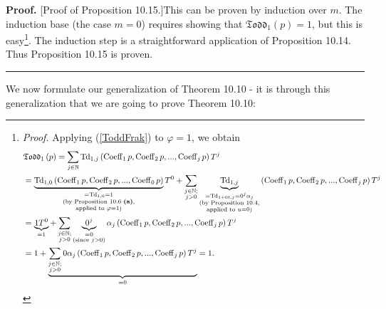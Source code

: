 \documentclass[numbers=enddot,12pt,final,onecolumn,notitlepage]{scrartcl}%
\newenvironment{proof}[1][Proof]{\noindent\textbf{#1.} }{\ \rule{0.5em}{0.5em}}
\begin{document}
\begin{proof}
[Proof of Proposition 10.15.]This can be proven by induction over $m$. The
induction base (the case $m=0$) requires showing that $\mathfrak{Todd}%
_{1}\left(  p\right)  =1$, but this is easy\footnote{\textit{Proof.} Applying
(\ref{ToddFrak}) to $\varphi=1$, we obtain%
\begin{align*}
&  \mathfrak{Todd}_{1}\left(  p\right)  =\sum\limits_{j\in\mathbb{N}%
}\operatorname*{Td}\nolimits_{1,j}\left(  \operatorname*{Coeff}\nolimits_{1}%
p,\operatorname*{Coeff}\nolimits_{2}p,...,\operatorname*{Coeff}\nolimits_{j}%
p\right)  T^{j}\\
&  =\underbrace{\operatorname*{Td}\nolimits_{1,0}\left(  \operatorname*{Coeff}%
\nolimits_{1}p,\operatorname*{Coeff}\nolimits_{2}p,...,\operatorname*{Coeff}%
\nolimits_{0}p\right)  }_{\substack{=\operatorname*{Td}\nolimits_{1,0}%
=1\\\text{(by Proposition 10.6 \textbf{(a)},}\\\text{applied to }%
\varphi=1\text{)}}}T^{0}+\sum_{\substack{j\in\mathbb{N};\\j>0}%
}\underbrace{\operatorname*{Td}\nolimits_{1,j}}_{\substack{=\operatorname*{Td}%
\nolimits_{1+0t,j}=0^{j}\alpha_{j}\\\text{(by Proposition 10.4,}%
\\\text{applied to }u=0\text{)}}}\left(  \operatorname*{Coeff}\nolimits_{1}%
p,\operatorname*{Coeff}\nolimits_{2}p,...,\operatorname*{Coeff}\nolimits_{j}%
p\right)  T^{j}\\
&  =\underbrace{1T^{0}}_{=1}+\sum_{\substack{j\in\mathbb{N};\\j>0}%
}\underbrace{0^{j}}_{\substack{=0\\\text{(since }j>0\text{)}}}\alpha
_{j}\left(  \operatorname*{Coeff}\nolimits_{1}p,\operatorname*{Coeff}%
\nolimits_{2}p,...,\operatorname*{Coeff}\nolimits_{j}p\right)  T^{j}\\
&  =1+\underbrace{\sum_{\substack{j\in\mathbb{N};\\j>0}}0\alpha_{j}\left(
\operatorname*{Coeff}\nolimits_{1}p,\operatorname*{Coeff}\nolimits_{2}%
p,...,\operatorname*{Coeff}\nolimits_{j}p\right)  T^{j}}_{=0}=1.
\end{align*}
}. The induction step is a straightforward application of Proposition 10.14.
Thus Proposition 10.15 is proven.
\end{proof}

We now formulate our generalization of Theorem 10.10 - it is through this
generalization that we are going to prove Theorem 10.10:
\end{document}
